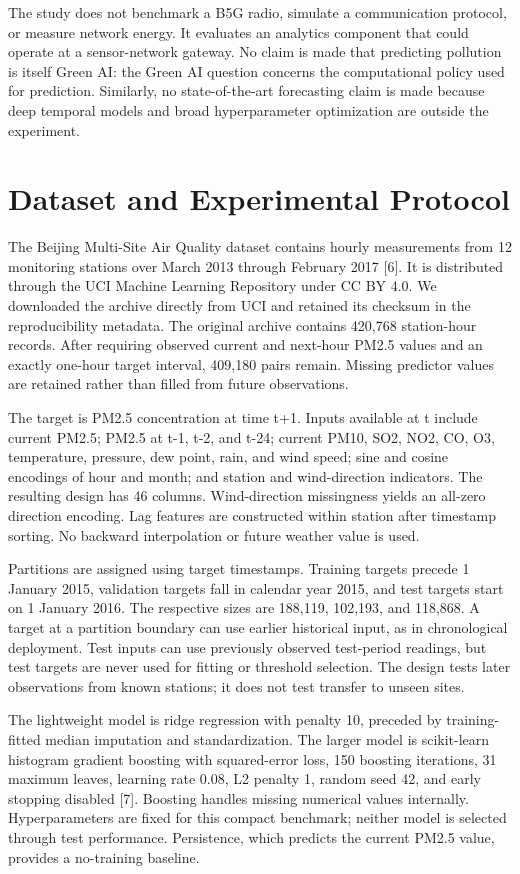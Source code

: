 \documentclass[conference,a4paper]{IEEEtran}
\begin{document}
The study does not benchmark a B5G radio, simulate a communication protocol, or measure network energy. It evaluates an analytics component that could operate at a sensor-network gateway. No claim is made that predicting pollution is itself Green AI: the Green AI question concerns the computational policy used for prediction. Similarly, no state-of-the-art forecasting claim is made because deep temporal models and broad hyperparameter optimization are outside the experiment.

\section{Dataset and Experimental Protocol}
The Beijing Multi-Site Air Quality dataset contains hourly measurements from 12 monitoring stations over March 2013 through February 2017 [6]. It is distributed through the UCI Machine Learning Repository under CC BY 4.0. We downloaded the archive directly from UCI and retained its checksum in the reproducibility metadata. The original archive contains 420,768 station-hour records. After requiring observed current and next-hour PM2.5 values and an exactly one-hour target interval, 409,180 pairs remain. Missing predictor values are retained rather than filled from future observations.

The target is PM2.5 concentration at time t+1. Inputs available at t include current PM2.5; PM2.5 at t-1, t-2, and t-24; current PM10, SO2, NO2, CO, O3, temperature, pressure, dew point, rain, and wind speed; sine and cosine encodings of hour and month; and station and wind-direction indicators. The resulting design has 46 columns. Wind-direction missingness yields an all-zero direction encoding. Lag features are constructed within station after timestamp sorting. No backward interpolation or future weather value is used.

Partitions are assigned using target timestamps. Training targets precede 1 January 2015, validation targets fall in calendar year 2015, and test targets start on 1 January 2016. The respective sizes are 188,119, 102,193, and 118,868. A target at a partition boundary can use earlier historical input, as in chronological deployment. Test inputs can use previously observed test-period readings, but test targets are never used for fitting or threshold selection. The design tests later observations from known stations; it does not test transfer to unseen sites.

The lightweight model is ridge regression with penalty 10, preceded by training-fitted median imputation and standardization. The larger model is scikit-learn histogram gradient boosting with squared-error loss, 150 boosting iterations, 31 maximum leaves, learning rate 0.08, L2 penalty 1, random seed 42, and early stopping disabled [7]. Boosting handles missing numerical values internally. Hyperparameters are fixed for this compact benchmark; neither model is selected through test performance. Persistence, which predicts the current PM2.5 value, provides a no-training baseline.
\end{document}
